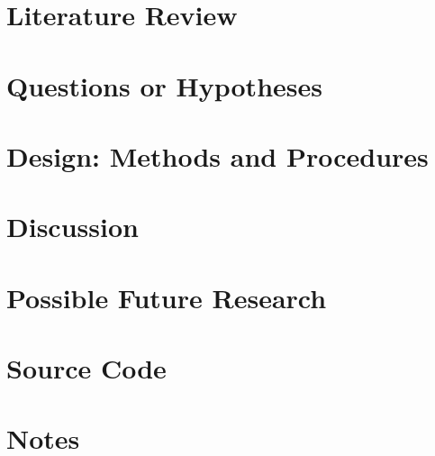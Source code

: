\documentclass[12pt,oneside,letterpaper,titlepage]{report}
\begin{document}
\chapter{Literature Review}

\newpage

  

\chapter{Questions or Hypotheses}

\newpage

  

\chapter{Design: Methods and Procedures}

\newpage

  

\chapter{Discussion}

\newpage

  

\chapter{Possible Future Research}

\newpage

  

\appendix

\chapter{Source Code}

\newpage

\label{sourceCode}



\chapter{Notes}


\newpage


\end{document}
